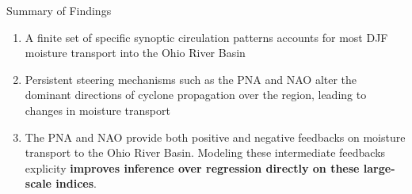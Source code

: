 \begin{block}{Summary of Findings}
    \begin{enumerate}
        \item A finite set of specific synoptic circulation patterns accounts for most DJF moisture transport into the Ohio River Basin
        \item Persistent steering mechanisms such as the PNA and NAO alter the dominant directions of cyclone propagation over the region, leading to changes in moisture transport
        \item The PNA and NAO provide both positive and negative feedbacks on moisture transport to the Ohio River Basin. Modeling these intermediate feedbacks explicity \textbf{improves inference over regression directly on these large-scale indices}.
    \end{enumerate}
\end{block}
